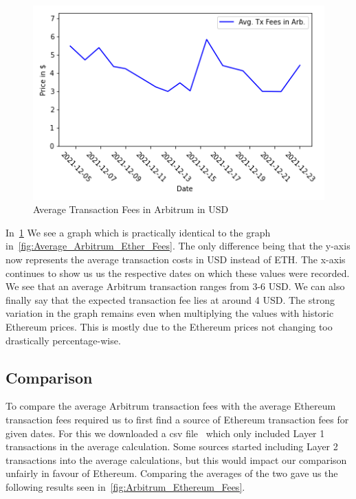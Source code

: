 \documentclass[a4paper,oneside,openright,11pt]{report}
\begin{document}
	\begin{figure}[h]
		\centering
		\includegraphics[scale=0.8]{./Pictures/arb_avg_usd1.png}
		\caption{Average Transaction Fees in Arbitrum in USD}
		\label{fig:Average_Arbitrum_USD_Fees}
	\end{figure}
	
	In~\cref{fig:Average_Arbitrum_USD_Fees} We see a graph which is practically identical to the graph
	in~\cref{fig:Average_Arbitrum_Ether_Fees}. The only difference being that the y-axis now represents the 
	average transaction costs in USD instead of ETH. The x-axis continues to show us
	us the respective dates on which these values were recorded. We see that an average
	Arbitrum transaction ranges from 3-6 USD. 
	We can also finally say that the expected transaction fee lies at around 4 USD.
	The strong variation in the graph remains even when multiplying the values 
	with historic Ethereum prices. This is mostly due to the Ethereum prices not 
	changing too drastically percentage-wise. 
	
	\clearpage
	\subsection{Comparison}
	To compare the average Arbitrum transaction fees with the average Ethereum transaction fees required us
	to first find a source of Ethereum transaction fees for given dates. For this we downloaded a csv file~\cite{ETHFees} 
	which only included Layer 1 transactions in the average calculation. Some sources started including Layer 2 transactions
	into the average calculations, but this would impact our comparison unfairly in favour of Ethereum. 
	Comparing the averages of the two gave us the following results seen in~\cref{fig:Arbitrum_Ethereum_Fees}.
	
\end{document}
